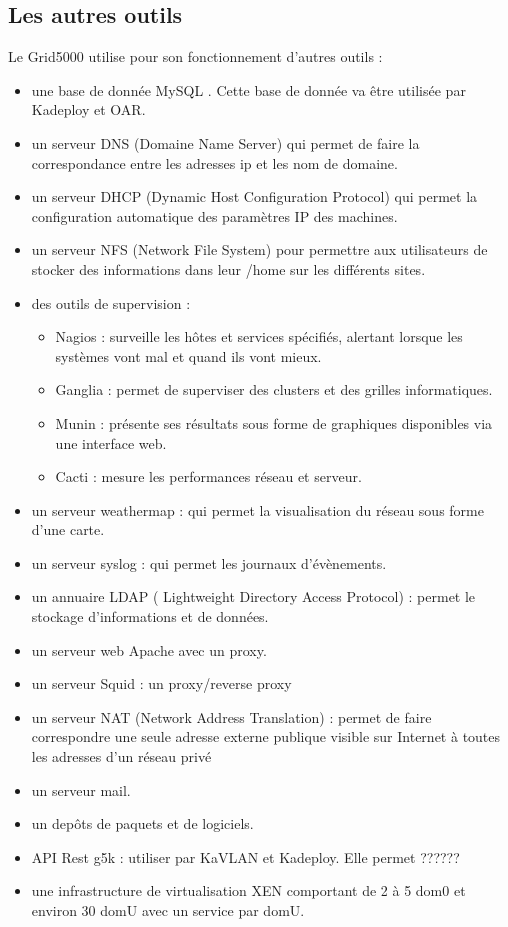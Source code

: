 \documentclass [10pt,a4paper]{report}
\begin{document}
		\subsection{Les autres outils}
			Le Grid5000 utilise pour son fonctionnement d'autres outils :
				\begin{itemize}
					\item une base de donnée MySQL . Cette base de donnée va \^etre utilisée par Kadeploy et OAR.
					\item un serveur DNS (Domaine Name Server) qui permet de faire la correspondance entre les adresses ip et les nom de domaine.			
					\item un serveur DHCP (Dynamic Host Configuration Protocol) qui permet la configuration automatique des paramètres IP des machines.
					\item un serveur NFS (Network File System) pour permettre aux utilisateurs de stocker des informations dans leur /home sur les
 différents sites.
 					\item des  outils de supervision : \begin{itemize}
 															\item Nagios : surveille les hôtes et services spécifiés, alertant lorsque les systèmes vont mal et quand ils vont mieux.
 															\item Ganglia : permet de superviser des clusters et des grilles informatiques. 
 															\item Munin : présente ses résultats sous forme de graphiques disponibles via une interface web.
 															\item Cacti : mesure les performances réseau et serveur.
 														\end{itemize}
 					\item un serveur weathermap : qui permet la visualisation du réseau sous forme d'une carte.
 					\item un serveur syslog : qui permet les journaux d'évènements.
 					\item un annuaire LDAP ( Lightweight Directory Access Protocol) : permet le stockage d'informations et de données.
 					\item un serveur web Apache avec un proxy.
 					\item un serveur Squid :  un proxy/reverse proxy
 					\item un serveur NAT (Network Address Translation) : permet de faire correspondre une seule adresse externe publique visible sur Internet à toutes les adresses d'un réseau privé
 					\item un serveur mail.
 					\item un dep\^ots de paquets et de logiciels.
 					\item API Rest g5k : utiliser par KaVLAN et Kadeploy. Elle permet ??????
 					\item une infrastructure de virtualisation XEN comportant de 2 à 5 dom0 et environ 30 domU avec un service par domU.
 					
				\end{itemize}
	
\end{document}

